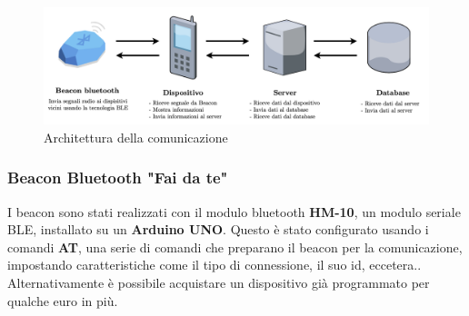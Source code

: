 \begin{center}
\begin{figure}[htp]
    \centering
    \includegraphics[width=15cm]{diagrams/diagramma_comunicazione.png}
    \caption{Architettura della comunicazione}
    \label{fig:architettura_comunicazione}
\end{figure}
\end{center}

\subsubsection{Beacon Bluetooth "Fai da te"}
I beacon sono stati realizzati con il modulo bluetooth \textbf{HM-10}, un modulo seriale BLE, installato su un \textbf{Arduino UNO}. Questo è stato configurato usando i comandi \textbf{AT}, una serie di comandi che preparano il beacon per la comunicazione, impostando caratteristiche come il tipo di connessione, il suo id, eccetera.\cite{comanti_at}. Alternativamente è possibile acquistare un dispositivo già programmato per qualche euro in più.


